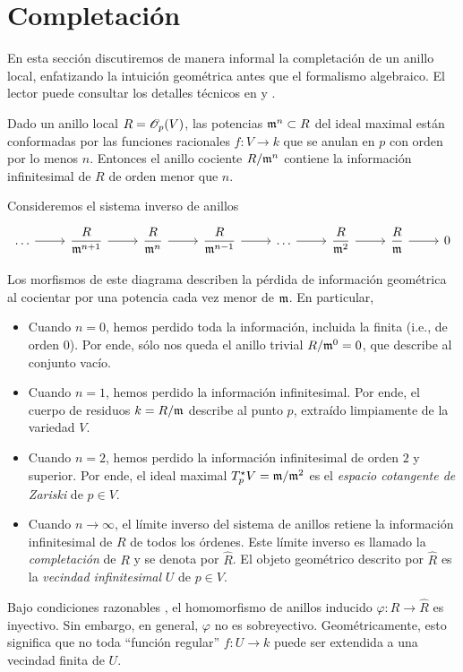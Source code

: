 \section{Completación}

\noindent En esta sección discutiremos de manera informal la completación de un anillo local, enfatizando la intuición geométrica antes que el formalismo algebraico. El lector puede consultar los detalles técnicos en \cite[pp. 100-123]{atiyah} y \cite[pp. 33-35, 207-216]{hartshorne}.

Dado un anillo local $R = \mathscr O_p(V)$, las potencias $\mathfrak m^n \subset R$ del ideal maximal están conformadas por las funciones racionales $f : V \to k$ que se anulan en $p$ con orden por lo menos $n$. Entonces el anillo cociente $R/\mathfrak m^n$ contiene la información infinitesimal de $R$ de orden menor que $n$.

Consideremos el sistema inverso de anillos
$$
\begin{tikzcd}
      \dots               \arrow[r]
    & \dfrac R {\m^{n+1}} \arrow[r]
    & \dfrac R {\m^n}     \arrow[r]
    & \dfrac R {\m^{n-1}} \arrow[r]
    & \dots               \arrow[r]
    & \dfrac R {\m^2}     \arrow[r]
    & \dfrac R \m         \arrow[r]
    & 0
\end{tikzcd}
$$

Los morfismos de este diagrama describen la pérdida de información geométrica al cocientar por una potencia cada vez menor de $\mathfrak m$. En particular,

\begin{itemize}
    \item Cuando $n = 0$, hemos perdido toda la información, incluida la finita (i.e., de orden $0$). Por ende, sólo nos queda el anillo trivial $R/\mathfrak m^0 = 0$, que describe al conjunto vacío.
    
    \item Cuando $n = 1$, hemos perdido la información infinitesimal. Por ende, el cuerpo de residuos $k = R/\mathfrak m$ describe al punto $p$, extraído limpiamente de la variedad $V$.
    
    \item Cuando $n = 2$, hemos perdido la información infinitesimal de orden $2$ y superior. Por ende, el ideal maximal $T_p^\star V = \mathfrak m/\mathfrak m^2$ es el \textit{espacio cotangente de Zariski} de $p \in V$.
    
    \item Cuando $n \to \infty$, el límite inverso del sistema de anillos retiene la información infinitesimal de $R$ de todos los órdenes. Este límite inverso es llamado la \textit{completación} de $R$ y se denota por $\widehat R$. El objeto geométrico descrito por $\widehat R$ es la \textit{vecindad infinitesimal} $U$ de $p \in V$.
\end{itemize}

Bajo condiciones razonables \cite[p. 110]{atiyah}, el homomorfismo de anillos inducido $\varphi : R \to \widehat R$ es inyectivo. Sin embargo, en general, $\varphi$ no es sobreyectivo. Geométricamente, esto significa que no toda ``función regular'' $f : U \to k$ puede ser extendida a una vecindad finita de $U$.
